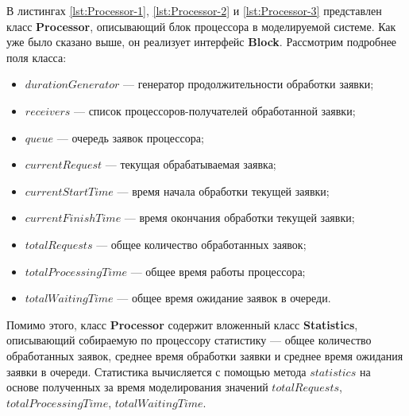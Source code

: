 В листингах \ref{lst:Processor-1}, \ref{lst:Processor-2} и \ref{lst:Processor-3} представлен класс \textbf{Processor}, описывающий блок процессора в моделируемой системе. Как уже было сказано выше, он реализует интерфейс \textbf{Block}. Рассмотрим подробнее поля класса:
\begin{itemize}
	\item $durationGenerator$ --- генератор продолжительности обработки заявки;
	\item $receivers$ --- список процессоров-получателей обработанной заявки;
	\item $queue$ --- очередь заявок процессора;
	\item $currentRequest$ --- текущая обрабатываемая заявка;
	\item $currentStartTime$ --- время начала обработки текущей заявки;
	\item $currentFinishTime$ --- время окончания обработки текущей заявки;
	\item $totalRequests$ --- общее количество обработанных заявок;
	\item $totalProcessingTime$ --- общее время работы процессора;
	\item $totalWaitingTime$ --- общее время ожидание заявок в очереди.
\end{itemize}
Помимо этого, класс \textbf{Processor} содержит вложенный класс \textbf{Statistics}, описывающий собираемую по процессору статистику --- общее количество обработанных заявок, среднее время обработки заявки и среднее время ожидания заявки в очереди. Статистика вычисляется с помощью метода $statistics$ на основе полученных за время моделирования значений $totalRequests$, $totalProcessingTime$, $totalWaitingTime$.

